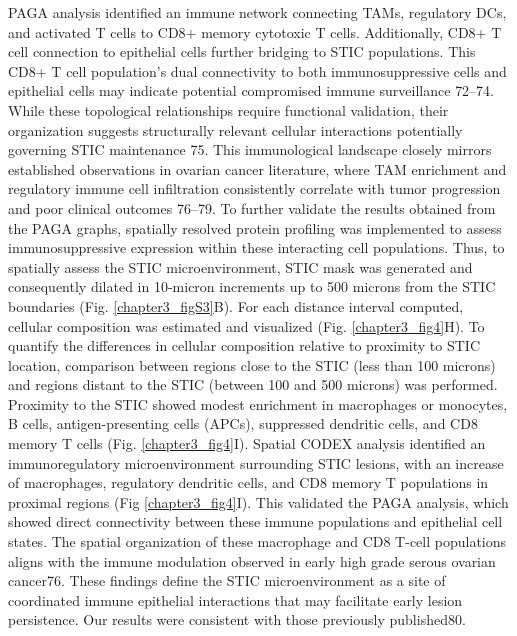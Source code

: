 \begin{refsection}
    PAGA analysis identified an immune network connecting TAMs, regulatory DCs, and activated T cells to CD8+ memory cytotoxic T cells. Additionally, CD8+ T cell connection to epithelial cells further bridging to STIC populations. This CD8+ T cell population's dual connectivity to both immunosuppressive cells and epithelial cells may indicate potential compromised immune surveillance \cite{Xu2024Spatiotemporal,Yeh2024Mapping,Vazquez2022Ovarian}72–74. While these topological relationships require functional validation, their organization suggests structurally relevant cellular interactions potentially governing STIC maintenance\cite{Mikulak2025Immune} 75. This immunological landscape closely mirrors established observations in ovarian cancer literature, where TAM enrichment and regulatory immune cell infiltration consistently correlate with tumor progression and poor clinical outcomes\cite{Kader2025Multimodal,Unraveling,Wang2025TAM,Yang2025Tumor} 76–79. 
    To further validate the results obtained from the PAGA graphs, spatially resolved protein profiling was implemented to assess immunosuppressive expression within these interacting cell populations. Thus, to spatially assess the STIC microenvironment, STIC mask was generated and consequently dilated in 10-micron increments up to 500 microns from the STIC boundaries (Fig. \ref{chapter3_figS3}B). For each distance interval computed, cellular composition was estimated and visualized (Fig. \ref{chapter3_fig4}H). To quantify the differences in cellular composition relative to proximity to STIC location, comparison between regions close to the STIC (less than 100 microns) and regions distant to the STIC (between 100 and 500 microns) was performed. Proximity to the STIC showed modest enrichment in macrophages or monocytes, B cells, antigen-presenting cells (APCs), suppressed dendritic cells, and CD8 memory T cells (Fig. \ref{chapter3_fig4}I).
    Spatial CODEX analysis identified an immunoregulatory microenvironment surrounding STIC lesions, with an increase of macrophages, regulatory dendritic cells, and CD8 memory T populations in proximal regions (Fig \ref{chapter3_fig4}I). This validated the PAGA analysis, which showed direct connectivity between these immune populations and epithelial cell states. The spatial organization of these macrophage and CD8 T-cell populations aligns with the immune modulation observed in early high grade serous ovarian cancer\cite{Kader2025Multimodal}76. These findings define the STIC microenvironment as a site of coordinated immune epithelial interactions that may facilitate early lesion persistence. Our results were consistent with those previously published\cite{Ardighieri2014Characterization}80.


\end{refsection}
